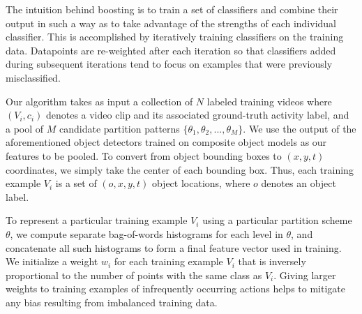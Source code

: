 \documentclass{bmvc2k}
\begin{document}
  The intuition behind boosting is to train a set of classifiers and
  combine their output in such a way as to take advantage of the strengths
  of each individual classifier.
  This is accomplished by iteratively training classifiers on the training data.
  Datapoints are re-weighted after each iteration so that classifiers added during
  subsequent iterations tend to focus on examples that were previously
  misclassified.

	Our algorithm takes as input a collection of $N$ labeled training videos 
  where $(V_i, c_i)$ denotes a video clip and its associated ground-truth
  activity label,
	and a pool of $M$ candidate partition patterns 
  $\{\theta_1, \theta_2, ..., \theta_M\}$.
  We use the output of the
  aforementioned object detectors trained on composite object models as our features to be
  pooled. To convert from object bounding boxes to $(x,y,t)$ coordinates, we
  simply take the center of each bounding box.
  Thus, each training example $V_i$ is a set of $(o,x,y,t)$ object
  locations, where $o$ denotes an object label.

  To represent a particular training example $V_i$ using a particular
  partition scheme $\theta$, we compute separate bag-of-words histograms for
  each level in $\theta$, and concatenate all such histograms to form a
  final feature vector used in training.
  We initialize a weight
  $w_i$ for each
	training example $V_i$ that is inversely proportional to the number of points
	with the same class as $V_i$. Giving larger weights to training examples of
  infrequently occurring actions helps to mitigate any bias resulting from imbalanced
  training data.
  
\end{document}
